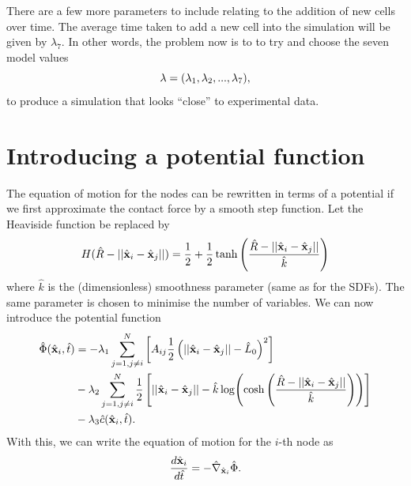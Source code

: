 There are a few more parameters to include relating to the addition of new cells over time.
The average time taken to add a new cell into the simulation will be given by $\lambda_7$.
In other words, the problem now is to to try and choose the seven model values
\begin{equation*}
    \vb{\lambda} = (\lambda_1, \lambda_2, ..., \lambda_7), 
\end{equation*}
to produce a simulation that looks ``close'' to experimental data. 

\section{Introducing a potential function}
The equation of motion for the nodes can be rewritten in terms of a potential
if we first approximate the contact force by a smooth step function.
Let the Heaviside function be replaced by 
\begin{equation*}
    H(\hat{R} - ||\hat{\vb{x}}_i - \hat{\vb{x}}_j||) = \frac{1}{2} + \frac{1}{2} \tanh\left( \frac{\hat{R} - ||\hat{\vb{x}}_i - \hat{\vb{x}}_j||}{\hat{k}}\right)
\end{equation*}
where $\hat{k}$ is the (dimensionless) smoothness parameter (same as for the SDFs). The same parameter is chosen
to minimise the number of variables. We can now introduce the potential function 
\begin{equation*}
    \begin{split}
        \hat{\Phi}(\hat{\vb{x}}_i, \hat{t}) &= 
        -\lambda_1 \sum_{j = 1, j \neq i}^N   \left[ A_{ij} \frac{1}{2}\left(||\hat{\vb{x}}_i - \hat{\vb{x}}_j|| - \hat{L}_0\right)^2  \right]\\
         &- \lambda_2\sum_{j = 1, j \neq i}^N \frac{1}{2}\left[||\hat{\vb{x}}_i - \hat{\vb{x}}_j|| - 
            \hat{k} \log(\cosh\left( \frac{\hat{R} - ||\hat{\vb{x}}_i - \hat{\vb{x}}_j||}{\hat{k}}\right) )    \right]\\ 
         &- \lambda_3  \hat{c} (\hat{\vb{x}}_i, \hat{t}).
    \end{split}
\end{equation*}
With this, we can write the equation of motion for the $i$-th node as 
\begin{equation*}
    \frac{d \hat{\vb{x}}_i}{d\hat{t}} = - \hat{\nabla}_{\hat{\vb{x}}_i} \hat{\Phi}.
\end{equation*}


